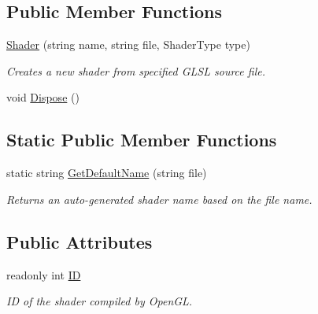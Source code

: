 \subsection*{Public Member Functions}
\begin{DoxyCompactItemize}
\item 
\hyperlink{class_tri_devs_1_1_tri_engine_1_1_shaders_1_1_shader_a8004bb8423bca0dda620f8e9e6341db0}{Shader} (string name, string file, Shader\-Type type)
\begin{DoxyCompactList}\small\item\em Creates a new shader from specified G\-L\-S\-L source file. \end{DoxyCompactList}\item 
void \hyperlink{class_tri_devs_1_1_tri_engine_1_1_shaders_1_1_shader_a0b2c1cdc220e6d56bb4c9b8f7fa2dbbe}{Dispose} ()
\end{DoxyCompactItemize}
\subsection*{Static Public Member Functions}
\begin{DoxyCompactItemize}
\item 
static string \hyperlink{class_tri_devs_1_1_tri_engine_1_1_shaders_1_1_shader_a6c2188d32cf5447edf26587204028fa4}{Get\-Default\-Name} (string file)
\begin{DoxyCompactList}\small\item\em Returns an auto-\/generated shader name based on the file name. \end{DoxyCompactList}\end{DoxyCompactItemize}
\subsection*{Public Attributes}
\begin{DoxyCompactItemize}
\item 
readonly int \hyperlink{class_tri_devs_1_1_tri_engine_1_1_shaders_1_1_shader_a0b76e92fedd5276309b1087489f15ed1}{I\-D}
\begin{DoxyCompactList}\small\item\em I\-D of the shader compiled by Open\-G\-L. \end{DoxyCompactList}\end{DoxyCompactItemize}
